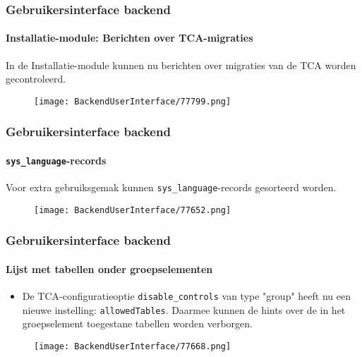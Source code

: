 \begin{frame}[fragile]
	\frametitle{Gebruikersinterface backend}
	\framesubtitle{Installatie-module: Berichten over TCA-migraties}

	In de Installatie-module kunnen nu berichten over migraties van de TCA worden gecontroleerd.

	\begin{figure}
		\texttt{[image: BackendUserInterface/77799.png]}
	\end{figure}

\end{frame}


\begin{frame}[fragile]
	\frametitle{Gebruikersinterface backend}
	\framesubtitle{\texttt{sys\_language}-records}

	Voor extra gebruiksgemak kunnen \texttt{sys\_language}-records gesorteerd worden.

	\begin{figure}
		\texttt{[image: BackendUserInterface/77652.png]}
	\end{figure}

\end{frame}


\begin{frame}[fragile]
	\frametitle{Gebruikersinterface backend}
	\framesubtitle{Lijst met tabellen onder groepselementen}

	\begin{itemize}

		\item De TCA-configuratieoptie \texttt{disable\_controls} van type "group"
			heeft nu een nieuwe instelling: \texttt{allowedTables}. Daarmee kunnen de hints 
			over de in het groepselement toegestane tabellen worden verborgen.

	\end{itemize}

	\begin{figure}
		\texttt{[image: BackendUserInterface/77668.png]}
	\end{figure}

\end{frame}

